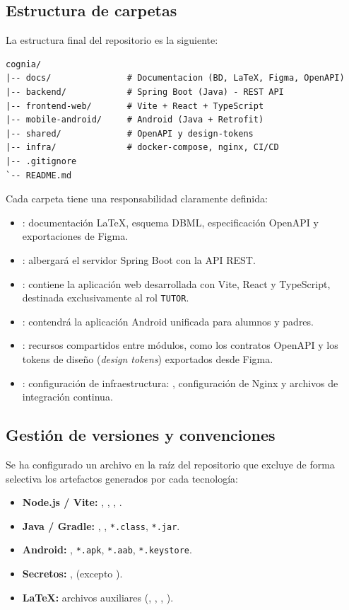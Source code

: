 \documentclass[12pt,a4paper]{report}
\begin{document}
\subsection{Estructura de carpetas}

La estructura final del repositorio es la siguiente:

\begin{verbatim}
cognia/
|-- docs/               # Documentacion (BD, LaTeX, Figma, OpenAPI)
|-- backend/            # Spring Boot (Java) - REST API
|-- frontend-web/       # Vite + React + TypeScript
|-- mobile-android/     # Android (Java + Retrofit)
|-- shared/             # OpenAPI y design-tokens
|-- infra/              # docker-compose, nginx, CI/CD
|-- .gitignore
`-- README.md
\end{verbatim}

Cada carpeta tiene una responsabilidad claramente definida:

\begin{itemize}
    \item {}: documentación LaTeX, esquema DBML, especificación OpenAPI y exportaciones de Figma.
    \item {}: albergará el servidor Spring Boot con la API REST.
    \item {}: contiene la aplicación web desarrollada con Vite, React y TypeScript, destinada exclusivamente al rol \texttt{TUTOR}.
    \item {}: contendrá la aplicación Android unificada para alumnos y padres.
    \item {}: recursos compartidos entre módulos, como los contratos OpenAPI y los tokens de diseño (\textit{design tokens}) exportados desde Figma.
    \item {}: configuración de infraestructura: , configuración de Nginx y archivos de integración continua.
\end{itemize}

\subsection{Gestión de versiones y convenciones}

Se ha configurado un archivo  en la raíz del repositorio que excluye de forma selectiva los artefactos generados por cada tecnología:

\begin{itemize}
    \item \textbf{Node.js / Vite:} , , , .
    \item \textbf{Java / Gradle:} , , \texttt{*.class}, \texttt{*.jar}.
    \item \textbf{Android:} , \texttt{*.apk}, \texttt{*.aab}, \texttt{*.keystore}.
    \item \textbf{Secretos:} ,  (excepto ).
    \item \textbf{LaTeX:} archivos auxiliares (, , , ).
\end{itemize}
\end{document}
